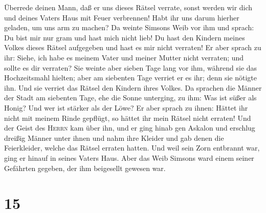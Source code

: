 Überrede deinen Mann, daß er uns dieses Rätsel verrate, sonst werden wir
dich und deines Vaters Haus mit Feuer verbrennen! Habt ihr uns darum
hierher geladen, um uns arm zu machen?  Da weinte Simsons
Weib vor ihm und sprach: Du bist mir nur gram und hast mich nicht lieb!
Du hast den Kindern meines Volkes dieses Rätsel aufgegeben und hast es
mir nicht verraten! Er aber sprach zu ihr: Siehe, ich habe es meinem
Vater und meiner Mutter nicht verraten; und sollte es dir verraten?
 Sie weinte aber sieben Tage lang vor ihm, während sie
das Hochzeitsmahl hielten; aber am siebenten Tage verriet er es ihr;
denn sie nötigte ihn. Und sie verriet das Rätsel den Kindern ihres
Volkes.  Da sprachen die Männer der Stadt am siebenten
Tage, ehe die Sonne unterging, zu ihm: Was ist süßer als Honig? Und wer
ist stärker als der Löwe? Er aber sprach zu ihnen: Hättet ihr nicht mit
meinem Rinde gepflügt, so hättet ihr mein Rätsel nicht erraten!
 Und der Geist des \textsc{Herrn} kam über ihn, und er
ging hinab gen Askalon und erschlug dreißig Männer unter ihnen und nahm
ihre Kleider und gab denen die Feierkleider, welche das Rätsel erraten
hatten. Und weil sein Zorn entbrannt war, ging er hinauf in seines
Vaters Haus.  Aber das Weib Simsons ward einem seiner
Gefährten gegeben, der ihm beigesellt gewesen war.

\hypertarget{section-14}{%
\section{15}\label{section-14}}

